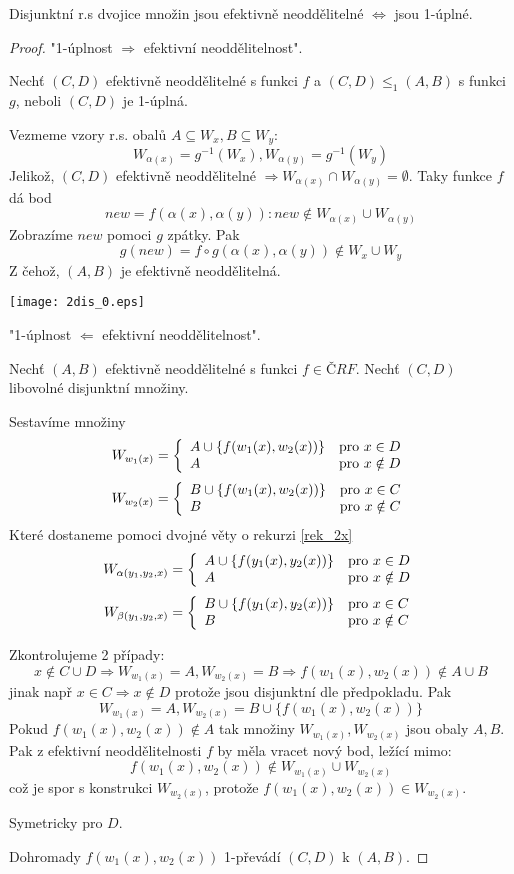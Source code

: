 \begin{theorem}
	Disjunktní r.s dvojice množin jsou efektivně neoddělitelné $\iff$ jsou 1-úplné.
\end{theorem}
\begin{proof}
	"1-úplnost $\Rightarrow$ efektivní neoddělitelnost".

	Nechť $(C, D)$ efektivně neoddělitelné s funkci $f$ a $(C, D) \leq_1 (A, B)$ s funkci $g$, neboli $(C, D)$ je 1-úplná.

	Vezmeme vzory r.s. obalů $A \subseteq W_x, B \subseteq W_y$:
	\[ W_{\alpha(x)} = g^{-1}(W_x), W_{\alpha(y)} = g^{-1}(W_y) \]
	Jelikož, $(C, D)$ efektivně neoddělitelné $\Rightarrow W_{\alpha(x)} \cap W_{\alpha(y)} = \emptyset$.
	Taky funkce $f$ dá bod
	\[ new = f(\alpha(x), \alpha(y)): new \notin W_{\alpha(x)} \cup W_{\alpha(y)} \]
	Zobrazíme $new$ pomoci $g$ zpátky. Pak
	\[ g(new) = f \circ g(\alpha(x), \alpha(y)) \notin W_x \cup W_y\]
	Z čehož, $(A, B)$ je efektivně neoddělitelná.

\texttt{[image: 2dis\_0.eps]}

	"1-úplnost $\Leftarrow$ efektivní neoddělitelnost".

	Nechť $(A, B)$ efektivně neoddělitelné s funkci $f \in ČRF$.
	Nechť $(C, D)$ libovolné disjunktní množiny.

	Sestavíme množiny
	\[ W_{w_1(x)} = \left\{ \begin{array}{ll}  A \cup \{ f(w_1(x), w_2(x)) \}  & \mbox{pro }  x \in D  \\  A  & \mbox{pro }  x \notin D  \end{array} \right. \]
	\[ W_{w_2(x)} = \left\{ \begin{array}{ll}  B \cup \{ f(w_1(x), w_2(x)) \}  & \mbox{pro }  x \in C  \\  B  & \mbox{pro }  x \notin C  \end{array} \right. \]
	Které dostaneme pomoci dvojné věty o rekurzi \cref{rek_2x}
	\[ W_{\alpha(y_1, y_2, x)} = \left\{ \begin{array}{ll}  A \cup \{ f(y_1(x), y_2(x)) \}  & \mbox{pro }  x \in D  \\  A  & \mbox{pro }  x \notin D  \end{array} \right. \]
	\[ W_{\beta(y_1, y_2, x)} = \left\{ \begin{array}{ll}  B \cup \{ f(y_1(x), y_2(x)) \}  & \mbox{pro }  x \in C  \\  B  & \mbox{pro }  x \notin C  \end{array} \right. \]


	Zkontrolujeme 2 případy:
	\[ x \notin C \cup D \Rightarrow W_{w_1(x)} = A, W_{w_2(x)} = B \Rightarrow f(w_1(x), w_2(x)) \notin A \cup B \]
	jinak např $x \in C \Rightarrow x \notin D$ protože jsou disjunktní dle předpokladu.
	Pak
	\[ W_{w_1(x)} = A, W_{w_2(x)} = B \cup \{ f(w_1(x), w_2(x)) \} \]
	Pokud $f(w_1(x), w_2(x)) \notin A$ tak množiny $W_{w_1(x)}, W_{w_2(x)}$ jsou obaly $A, B$.
	Pak z efektivní neoddělitelnosti $f$ by měla vracet nový bod, ležící mimo:
	\[ f(w_1(x), w_2(x)) \notin W_{w_1(x)} \cup W_{w_2(x)} \]
	což je spor s konstrukci $W_{w_2(x)}$, protože $f(w_1(x), w_2(x)) \in W_{w_2(x)}$.

	Symetricky pro $D$.

	Dohromady $f(w_1(x), w_2(x))$ 1-převádí $(C, D)$ k $(A, B)$.
\end{proof}

